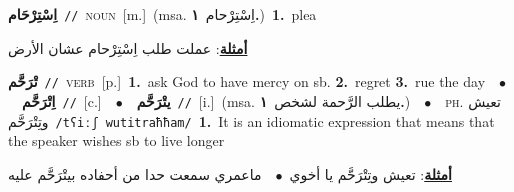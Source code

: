 \documentclass[10pt,a4paper,twoside]{article} %
\begin{document}
\begin{multicols}{2}
{\setlength\topsep{0pt}\textbf{\foreignlanguage{arabic}{اِسْتِرْحَام}}\ {\color{gray}\texttt{//}\color{black}}\ \textsc{noun}\ [m.]\ \color{gray}(msa. \foreignlanguage{arabic}{اِسْتِرْحام}~\foreignlanguage{arabic}{\textbf{١.}})\color{black}\ \textbf{1.}~plea\  \begin{flushright}\color{gray}\foreignlanguage{arabic}{\textbf{\underline{\foreignlanguage{arabic}{أمثلة}}}: عملت طلب اِسْتِرْحام عشان الأرض}\end{flushright}\color{black}} \vspace{2mm}

{\setlength\topsep{0pt}\textbf{\foreignlanguage{arabic}{تْرَحَّم}}\ {\color{gray}\texttt{//}\color{black}}\ \textsc{verb}\ [p.]\ \textbf{1.}~ask God to have mercy on sb.  \textbf{2.}~regret  \textbf{3.}~rue the day\ \ $\bullet$\ \ \setlength\topsep{0pt}\textbf{\foreignlanguage{arabic}{اِتْرَحَّم}}\ {\color{gray}\texttt{//}\color{black}}\ [c.]\ \ $\bullet$\ \ \setlength\topsep{0pt}\textbf{\foreignlanguage{arabic}{يتْرَحَّم}}\ {\color{gray}\texttt{//}\color{black}}\ [i.]\ \color{gray}(msa. \foreignlanguage{arabic}{يطلب الرَّحمة لشخص}~\foreignlanguage{arabic}{\textbf{١.}})\color{black}\ \ $\bullet$\ \ \textsc{ph.} \color{gray} \foreignlanguage{arabic}{تعيش وتِتْرَحَّم}\color{black}\ {\color{gray}\texttt{/{\sffamily tʕiːʃ wutitraħħam}/}\color{black}}\ \textbf{1.}~It is an idiomatic expression that means that the speaker wishes sb to live longer\  \begin{flushright}\color{gray}\foreignlanguage{arabic}{\textbf{\underline{\foreignlanguage{arabic}{أمثلة}}}: تعيش وتِتْرَحَّم يا أخوي\ $\bullet$\ \  ماعمري سمعت حدا من أحفاده بيتْرَحَّم عليه}\end{flushright}\color{black}} \vspace{2mm}


\end{multicols}
\end{document}
